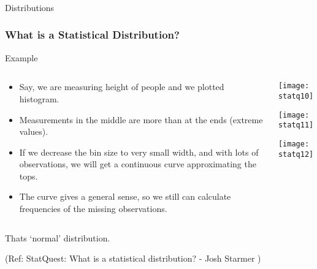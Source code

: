 \begin{frame}[fragile]\frametitle{}
\begin{center}
{\Large Distributions}
\end{center}
\end{frame}


\begin{frame}[fragile]\frametitle{What is a Statistical Distribution?}

Example
\begin{columns}
    \begin{column}[T]{0.6\linewidth}
	\begin{itemize}
	\item Say, we are measuring height of people and we plotted histogram.
	\item Measurements in the middle are more than at the ends (extreme values).
	\item If we decrease the bin size to very small width, and with lots of observations, we will get a continuous curve approximating the tops.
	\item The curve gives a general sense, so we still can calculate frequencies of the missing observations.
	\end{itemize}

    \end{column}
    \begin{column}[T]{0.4\linewidth}
      \begin{center}
      \texttt{[image: statq10]}
	  
	  \texttt{[image: statq11]}
	  
	  \texttt{[image: statq12]}	  
	  	\end{center}
    \end{column}

  \end{columns}
  
Thats `normal' distribution.

\tiny{(Ref: StatQuest: What is a statistical distribution? - Josh Starmer )}
\end{frame}


